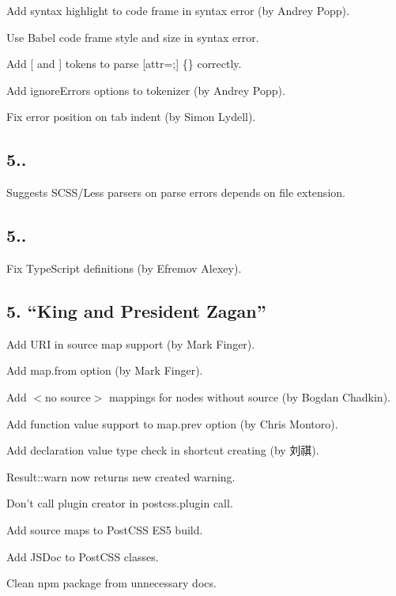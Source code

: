 \begin{DoxyItemize}
\item Add syntax highlight to code frame in syntax error (by Andrey Popp).
\item Use Babel code frame style and size in syntax error.
\item Add {\ttfamily \mbox{[}} and {\ttfamily \mbox{]}} tokens to parse {\ttfamily \mbox{[}attr=;\mbox{]} \{\}} correctly.
\item Add {\ttfamily ignore\+Errors} options to tokenizer (by Andrey Popp).
\item Fix error position on tab indent (by Simon Lydell).
\end{DoxyItemize}

\subsection*{5..}


\begin{DoxyItemize}
\item Suggests S\+C\+S\+S/\+Less parsers on parse errors depends on file extension.
\end{DoxyItemize}

\subsection*{5..}


\begin{DoxyItemize}
\item Fix Type\+Script definitions (by Efremov Alexey).
\end{DoxyItemize}

\subsection*{5. “\+King and President Zagan”}


\begin{DoxyItemize}
\item Add U\+RI in source map support (by Mark Finger).
\item Add {\ttfamily map.\+from} option (by Mark Finger).
\item Add {\ttfamily $<$no source$>$} mappings for nodes without source (by Bogdan Chadkin).
\item Add function value support to {\ttfamily map.\+prev} option (by Chris Montoro).
\item Add declaration value type check in shortcut creating (by 刘祺).
\item {\ttfamily Result\+::warn} now returns new created warning.
\item Don’t call plugin creator in {\ttfamily postcss.\+plugin} call.
\item Add source maps to Post\+C\+SS E\+S5 build.
\item Add J\+S\+Doc to Post\+C\+SS classes.
\item Clean npm package from unnecessary docs.
\end{DoxyItemize}

